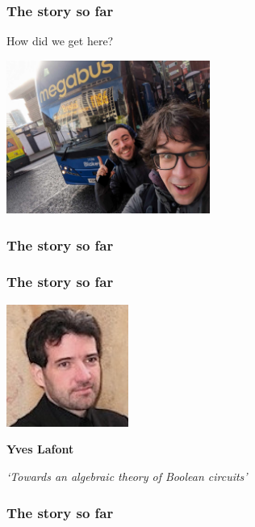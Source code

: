 \begin{frame}
    \frametitle{The story so far}

    \centering
    \LARGE

    How did we get here?

    \includegraphics[width=0.5\textwidth]{imgs/megabus}

\end{frame}

\begin{frame}
    \frametitle{The story so far}

    \centering


\end{frame}

\begin{frame}
    \frametitle{The story so far}

    \centering
    \includegraphics[width=0.3\textwidth]{imgs/lafont}

    \LARGE
    \textbf{Yves Lafont}

    \normalsize
    \emph{`Towards an algebraic theory of Boolean circuits'}

\end{frame}

\begin{frame}
    \frametitle{The story so far}

    \centering


\end{frame}

